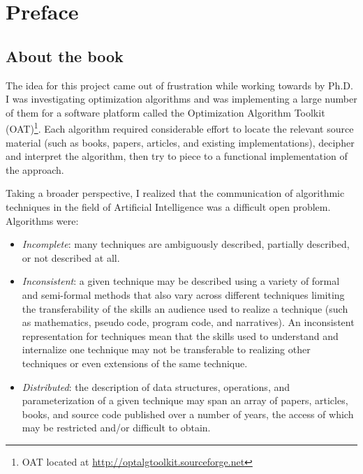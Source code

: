 

\chapter*{Preface}

% 
% 
\section*{About the book}
The idea for this project came out of frustration while working towards by Ph.D. I was investigating optimization algorithms and was implementing a large number of them for a software platform called the Optimization Algorithm Toolkit (OAT)\footnote{OAT located at \url{http://optalgtoolkit.sourceforge.net}}. Each algorithm required considerable effort to locate the relevant source material (such as books, papers, articles, and existing implementations), decipher and interpret the algorithm, then try to piece to a functional implementation of the approach. 

Taking a broader perspective, I realized that the communication of algorithmic techniques in the field of Artificial Intelligence was a difficult open problem. Algorithms were:

\begin{itemize}
	\item \emph{Incomplete}: many techniques are ambiguously described, partially described, or not described at all.
	\item \emph{Inconsistent}: a given technique may be described using a variety of formal and semi-formal methods that also vary across different techniques limiting the transferability of the skills an audience used to realize a technique (such as mathematics, pseudo code, program code, and narratives). An inconsistent representation for techniques mean that the skills used to understand and internalize one technique may not be transferable to realizing other techniques or even extensions of the same technique.
	\item \emph{Distributed}: the description of data structures, operations, and parameterization of a given technique may span an array of papers, articles, books, and source code published over a number of years, the access of which may be restricted and/or difficult to obtain.
\end{itemize}

